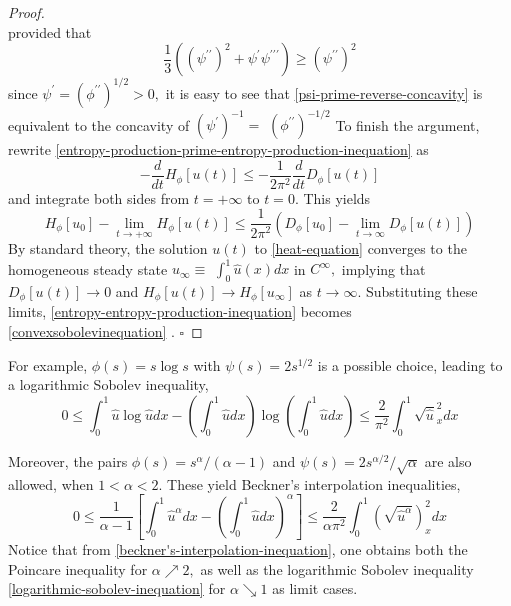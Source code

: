 \begin{proof}
\begin{equation}
	\end{equation}
	provided that
\begin{equation}\label{psi-prime-reverse-concavity}
		\frac{1}{3}\left(\left(\psi^{\prime \prime}\right)^{2}+\psi^{\prime} \psi^{\prime \prime \prime}\right) \geq\left(\psi^{\prime \prime}\right)^{2}
\end{equation}
	since $\psi^{\prime}=\left(\phi^{\prime \prime}\right)^{1 / 2}>0,$ it is easy to see that \eqref{psi-prime-reverse-concavity} is equivalent to the concavity of $\left(\psi^{\prime}\right)^{-1}=$ $\left(\phi^{\prime \prime}\right)^{-1 / 2}$
	To finish the argument, rewrite \eqref{entropy-production-prime-entropy-production-inequation} as
	$$
	-\frac{d}{d t} H_{\phi}[u(t)] \leq-\frac{1}{2 \pi^{2}} \frac{d}{d t} D_{\phi}[u(t)]
	$$
	and integrate both sides from $t=+\infty$ to $t=0 .$ This yields
\begin{equation}\label{entropy-entropy-production-inequation}
		H_{\phi}\left[u_{0}\right]-\lim _{t \rightarrow+\infty} H_{\phi}[u(t)] \leq \frac{1}{2 \pi^{2}}\left(D_{\phi}\left[u_{0}\right]-\lim _{t \rightarrow \infty} D_{\phi}[u(t)]\right)
\end{equation}
	By standard theory, the solution $u(t)$ to \eqref{heat-equation} converges to the homogeneous steady state $u_{\infty} \equiv$ $\int_{0}^{1} \hat{u}(x) d x$ in $C^{\infty},$ implying that $D_{\phi}[u(t)] \rightarrow 0$ and $H_{\phi}[u(t)] \rightarrow H_{\phi}\left[u_{\infty}\right]$ as $t \rightarrow \infty .$ Substituting
	these limits, \eqref{entropy-entropy-production-inequation} becomes \eqref{convexsobolevinequation} . $\square$

\end{proof}
	For example, $\phi(s)=s \log s$ with $\psi(s)=2 s^{1 / 2}$ is a possible choice, leading to a logarithmic Sobolev inequality,
\begin{equation}
	0 \leq \int_{0}^{1} \hat{u} \log \hat{u} d x-\left(\int_{0}^{1} \hat{u} d x\right) \log \left(\int_{0}^{1} \hat{u} d x\right) \leq \frac{2}{\pi^{2}} \int_{0}^{1} \sqrt{\hat{u}}_{x}^{2} d x\label{logarithmic-sobolev-inequation}
\end{equation}


Moreover, the pairs $\phi(s)=s^{\alpha} /(\alpha-1)$ and $\psi(s)=2 s^{\alpha / 2} / \sqrt{\alpha}$ are also allowed, when $1<\alpha<2$. These yield Beckner's interpolation inequalities,
\begin{equation}\label{beckner's-interpolation-inequation}
	0 \leq \frac{1}{\alpha-1}\left[\int_{0}^{1} \hat{u}^{\alpha} d x-\left(\int_{0}^{1} \hat{u} d x\right)^{\alpha}\right] \leq \frac{2}{\alpha \pi^{2}} \int_{0}^{1}\left(\sqrt{\hat{u}^{\alpha}}\right)_{x}^{2} d x
\end{equation}
Notice that from \eqref{beckner's-interpolation-inequation}, one obtains both the Poincare inequality for $\alpha \nearrow 2,$ as well as the logarithmic Sobolev inequality \eqref{logarithmic-sobolev-inequation} for $\alpha \searrow 1$ as limit cases.

